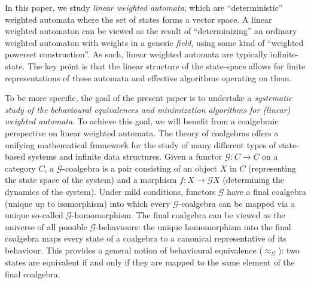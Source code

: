 \documentclass[3p]{elsarticle}
\newcommand{\fG}{\mathcal{G}}    %
\newcommand{\fW}{\mathcal{W}}    %
\newcommand{\fL}{\mathcal{L}}    %
\newcommand\F{\mathcal{F}}
\newcommand\V{\mathcal{V}}
\begin{document}
In this paper, we study {\em linear weighted automata}, which
are ``deterministic'' weighted automata where the set of states forms a vector space.
A linear weighted automaton can be viewed as the result of ``determinizing''  an
ordinary  weighted automaton with weights in a generic {\em field}, using some kind of
``weighted powerset construction''. As such, linear weighted automata are  typically
infinite-state. The key point is that the linear structure of the state-space allows
for finite representations of these automata and effective algorithms operating on them.

To be more specific, the goal of the present paper is to undertake a \emph{systematic study of
the behavioural equivalences and minimization algorithms for (linear) weighted automata}.
To achieve this goal, we will benefit from a coalgebraic perspective on linear weighted automata.
The theory of coalgebras offers a unifying mathematical framework for the study of
many different types of state-based systems and infinite data structures.
Given a functor $\fG\colon  C \to C$ on a category $C$, a $\fG$-coalgebra is a pair consisting of an
object $X$ in $C$ (representing the state space of the system) and a morphism $f:X \to \fG X$ (determining the dynamics
of the system). Under mild conditions, functors $\fG$ have a final coalgebra (unique up to isomorphism)
into which every $\fG$-coalgebra can be mapped via a unique so-called $\fG$-homomorphism.
The final coalgebra can be viewed as the universe of all possible $\fG$-behaviours: the
unique homomorphism into the final coalgebra maps every state of a coalgebra to a
canonical representative of its behaviour. This provides a general notion of behavioural
equivalence ($\approx_{\fG}$): two states are equivalent if and only if they are mapped to the same element
of the final coalgebra.

%
\end{document}
